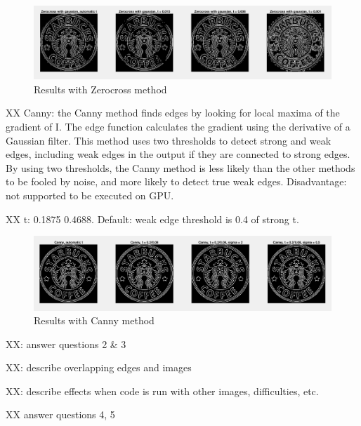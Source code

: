 \begin{figure}[!hbt]
  \includegraphics[width=\textwidth]{./img/ex1/im5.png}
  \caption{Results with Zerocross method}
  \label{fig:im5}
\end{figure}

XX Canny: the Canny method finds edges by looking for local maxima of the gradient of I. The edge function calculates the gradient using the derivative of a Gaussian filter. This method uses two thresholds to detect strong and weak edges, including weak edges in the output if they are connected to strong edges. By using two thresholds, the Canny method is less likely than the other methods to be fooled by noise, and more likely to detect true weak edges. Disadvantage: not supported to be executed on GPU.

XX t: 0.1875    0.4688. Default: weak edge threshold is 0.4 of strong t. 

\begin{figure}[!hbt]
  \includegraphics[width=\textwidth]{./img/ex1/im6.png}
  \caption{Results with Canny method}
  \label{fig:im6}
\end{figure}

XX: answer questions 2 \& 3

XX: describe overlapping edges and images

XX: describe effects when code is run with other images, difficulties, etc.

XX answer questions 4, 5